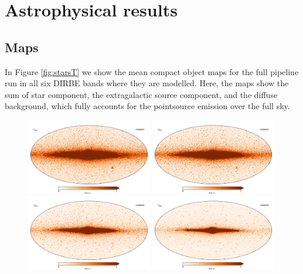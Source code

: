 \documentclass{aa}
\begin{document}
\section{Astrophysical results}
\label{sec:results}

\subsection{Maps}

In Figure \ref{fig:starsT} we show the mean compact object maps for the full pipeline run in all six DIRBE bands where they are modelled. Here, the maps show the sum of star component, the extragalactic source component, and the diffuse background, which fully accounts for the pointsource emission over the full sky.

\begin{figure}
  \centering
  \includegraphics[width=0.49\textwidth]{figs/starmaps/all_stars_mean_01.pdf}
  \includegraphics[width=0.49\textwidth]{figs/starmaps/all_stars_mean_02.pdf} \\
  \includegraphics[width=0.49\textwidth]{figs/starmaps/all_stars_mean_03.pdf}
  \includegraphics[width=0.49\textwidth]{figs/starmaps/all_stars_mean_04.pdf} \\

\end{figure}
\end{document}
